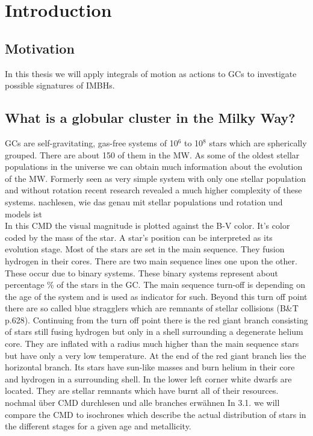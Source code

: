 

\section{Introduction}

\subsection{Motivation}
In this thesis we will apply integrals of motion as actions to  \ac{GC}s to investigate possible signatures of \ac{IMBH}s. 
\subsection{What is a globular cluster in the Milky Way?}\label{sec1.2}
\ac{GC}s are self-gravitating, gas-free systems of 10\(^6\) to 10\(^8\) stars which are spherically grouped. There are about 150 of them in the \ac{MW}. As some of the oldest stellar populations in the universe we can obtain much information about the evolution of the \ac{MW}. Formerly seen as very simple system with only one stellar population and without rotation recent research revealed a much higher complexity of these systems. \color{red} nachlesen, wie das genau mit stellar populations und rotation und models ist \color{black}
\\In this \ac{CMD} the visual magnitude is plotted against the B-V color. It's color coded by the mass of the star. A star's position can be interpreted as its evolution stage. Most of the stars are set in the main sequence. They fusion hydrogen in their cores. There are two main sequence lines one upon the other. These occur due to binary systems. These binary systems represent about \color{red} percentage \color{black} \% of the stars in the \ac{GC}. The main sequence turn-off is depending on the age of the system and is used as indicator for such. Beyond this turn off point there are so called blue stragglers which are remnants of stellar collisions (B\&T p.628). Continuing from the turn off point there is the red giant branch consisting of stars still fusing hydrogen but only in a shell surrounding a degenerate helium core. They are inflated with a radius much higher than the main sequence stars but have only a very low temperature. At the end of the red giant branch lies the horizontal branch. Its stars have sun-like masses and burn helium in their core and hydrogen in a surrounding shell. In the lower left corner white dwarfs are located. They are stellar remnants which have burnt all of their resources. \color{red} nochmal über \ac{CMD} durchlesen und alle branches erwähnen \color{black} In 3.1. we will compare the \ac{CMD} to isochrones which describe the actual distribution of stars in the different stages for a given age and metallicity. 
